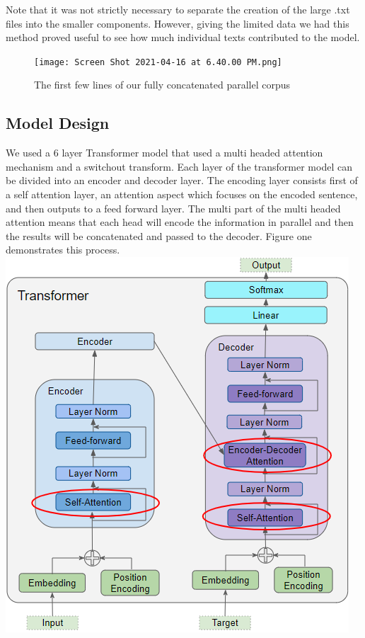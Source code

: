 \documentclass[letterpaper, 12 pt, conference]{ieeeconf}  %
\begin{document}
Note that it was not strictly necessary to separate the creation of the large .txt files into the smaller components. However, giving the limited data we had this method proved useful to see how much individual texts contributed to the model. 

\begin{figure}
  \texttt{[image: Screen Shot 2021-04-16 at 6.40.00 PM.png]}
  \caption{The first few lines of our fully concatenated parallel corpus}
\end{figure}


\subsection{Model Design}
We used a 6 layer Transformer model that used a multi headed attention mechanism and a switchout transform. Each layer of the transformer model can be divided into an encoder and decoder layer. The encoding layer consists first of a self attention layer, an attention aspect which focuses on the encoded sentence, and then outputs to a feed forward layer. The multi part of the multi headed attention means that each head will encode the information in parallel and then the results will be concatenated and passed to the decoder. Figure one demonstrates this process.
\includegraphics[scale=.4]{Transformer.png}
\end{document}
